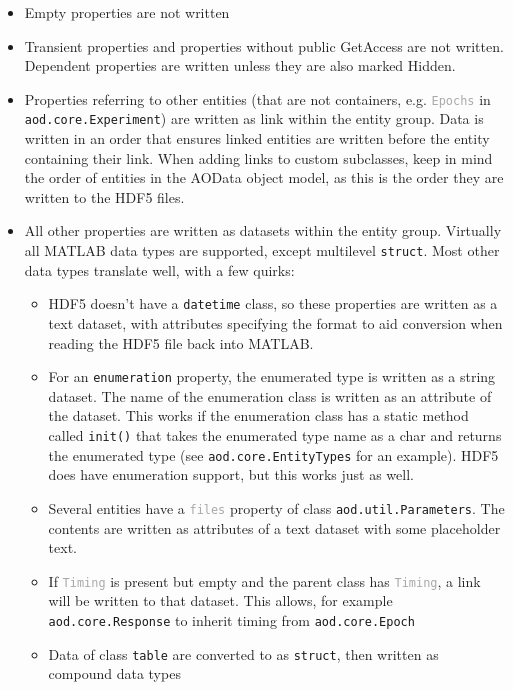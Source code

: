 \documentclass[10pt]{exam}
\newcommand\aodclass[1]{\textcolor{codeblue}{\texttt{#1}}}
\newcommand\matclass[1]{\textcolor{codeblue}{\texttt{#1}}}
\newcommand\aodprop[1]{\textcolor{darkgray}{\texttt{#1}}}
\newcommand\aodfcn[1]{\textcolor{darkteal}{\texttt{#1}}}
\begin{document}
		\begin{itemize}
			\item Empty properties are not written
			\item Transient properties and properties without public GetAccess are not written. Dependent properties are written unless they are also marked Hidden.
			\item Properties referring to other entities (that are not containers, e.g. \aodprop{Epochs} in \aodclass{aod.core.Experiment}) are written as link within the entity group. Data is written in an order that ensures linked entities are written before the entity containing their link. When adding links to custom subclasses, keep in mind the order of entities in the AOData object model, as this is the order they are written to the HDF5 files. 
			\item All other properties are written as datasets within the entity group. Virtually all MATLAB data types are supported, except multilevel \matclass{struct}. Most other data types translate well, with a few quirks:
			\begin{itemize}
				\item HDF5 doesn't have a \matclass{datetime} class, so these properties are written as a text dataset, with attributes specifying the format to aid conversion when reading the HDF5 file back into MATLAB.
				\item For an \aodclass{enumeration} property, the enumerated type is written as a string dataset. The name of the enumeration class is written as an attribute of the dataset. This works if the enumeration class has a static method called \aodfcn{init()} that takes the enumerated type name as a char and returns the enumerated type (see \aodclass{aod.core.EntityTypes} for an example). HDF5 does have enumeration support, but this works just as well. 
				\item Several entities have a \aodprop{files} property of class \aodclass{aod.util.Parameters}. The contents are written as attributes of a text dataset with some placeholder text.
				\item If \aodprop{Timing} is present but empty and the parent class has \aodprop{Timing}, a link will be written to that dataset. This allows, for example \aodclass{aod.core.Response} to inherit timing from \aodclass{aod.core.Epoch}
				\item Data of class \matclass{table} are converted to as \aodclass{struct}, then written as compound data types

\end{itemize}
\end{itemize}
\end{document}
